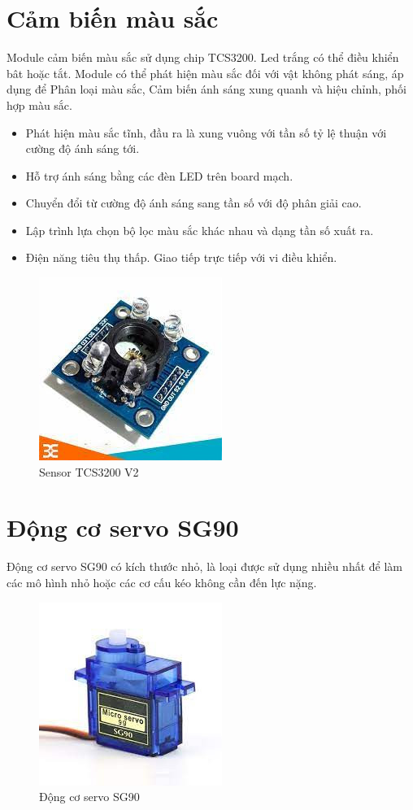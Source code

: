 \documentclass[12pt]{report}
\begin{document}
\section{Cảm biến màu sắc}
Module cảm biến màu sắc sử dụng chip TCS3200. Led trắng có thể điều khiển bât hoặc tắt. Module có thể phát hiện màu sắc đối với vật không phát sáng, áp dụng để Phân loại màu sắc, Cảm biến ánh sáng xung quanh và hiệu chỉnh, phối hợp màu sắc.


\begin{itemize}[itemsep=0pt, parsep=0pt]
    \item Phát hiện màu sắc tĩnh, đầu ra là xung vuông với tần số tỷ lệ thuận với cường độ ánh sáng tới.
    \item Hỗ trợ ánh sáng bằng các đèn LED trên board mạch.
    \item Chuyển đổi từ cường độ ánh sáng sang tần số với độ phân giải cao.
    \item Lập trình lựa chọn bộ lọc màu sắc khác nhau và dạng tần số xuất ra.
    \item Điện năng tiêu thụ thấp. Giao tiếp trực tiếp với vi điều khiển.
\end{itemize}


\begin{figure}[H]
    \centering
    \includegraphics[width=0.4\linewidth]{image/sensor.jpg}
    \caption{Sensor TCS3200 V2}
\end{figure}

\section{Động cơ servo SG90}
Động cơ servo SG90 có kích thước nhỏ, là loại được sử dụng nhiều nhất để làm các mô hình nhỏ hoặc các cơ cấu kéo không cần đến lực nặng.
    \begin{figure}[H]
        \centering
        \includegraphics[width=0.5\linewidth]{image/servo.jpg}
        \caption{Động cơ servo SG90}
    \end{figure}
    
\end{document}
